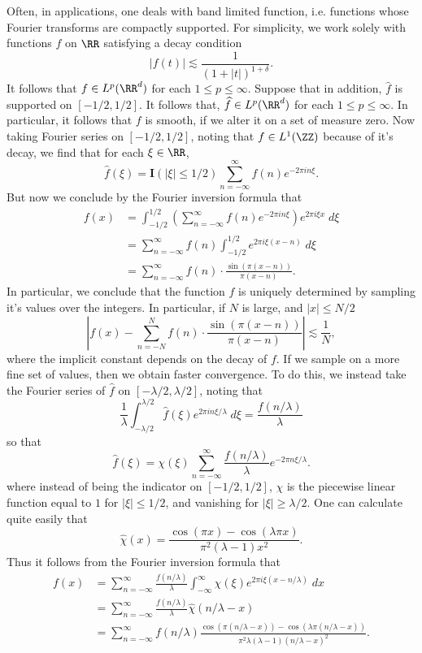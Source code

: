 Often, in applications, one deals with band limited function, i.e. functions whose Fourier transforms are compactly supported. For simplicity, we work solely with functions $f$ on $\RR$ satisfying a decay condition
%
\[ |f(t)| \lesssim \frac{1}{(1 + |t|)^{1 + \delta}}. \]
%
It follows that $f \in L^p(\RR^d)$ for each $1 \leq p \leq \infty$. Suppose that in addition, $\widehat{f}$ is supported on $[-1/2,1/2]$. It follows that, $\widehat{f} \in L^p(\RR^d)$ for each $1 \leq p \leq \infty$. In particular, it follows that $f$ is smooth, if we alter it on a set of measure zero. Now taking Fourier series on $[-1/2,1/2]$, noting that $f \in L^1(\ZZ)$ because of it's decay, we find that for each $\xi \in \RR$,
%
\[ \widehat{f}(\xi) = \mathbf{I}(|\xi| \leq 1/2) \sum_{n = -\infty}^\infty f(n) e^{-2 \pi i n \xi}. \]
%
But now we conclude by the Fourier inversion formula that
%
\begin{align*}
    f(x) &= \int_{-1/2}^{1/2} \left( \sum_{n = -\infty}^\infty f(n) e^{-2 \pi i n \xi} \right) e^{2 \pi i \xi x}\; d\xi\\
    &= \sum_{n = -\infty}^\infty f(n) \int_{-1/2}^{1/2} e^{2 \pi i \xi (x-n)}\; d\xi\\
    &= \sum_{n = -\infty}^\infty f(n) \cdot \frac{\sin(\pi (x - n))}{\pi (x-n)}.
\end{align*}
%
In particular, we conclude that the function $f$ is uniquely determined by sampling it's values over the integers. In particular, if $N$ is large, and $|x| \leq N/2$
%
\[ \left| f(x) - \sum_{n = -N}^N f(n) \cdot \frac{\sin(\pi(x - n))}{\pi (x - n)} \right| \lesssim \frac{1}{N}, \]
%
where the implicit constant depends on the decay of $f$. If we sample on a more fine set of values, then we obtain faster convergence. To do this, we instead take the Fourier series of $\widehat{f}$ on $[-\lambda/2,\lambda/2]$, noting that
%
\[ \frac{1}{\lambda} \int_{-\lambda/2}^{\lambda/2} \widehat{f}(\xi) e^{2 \pi i n \xi / \lambda}\; d\xi = \frac{f(n/\lambda)}{\lambda} \]
%
so that
%
\[ \widehat{f}(\xi) = \chi(\xi) \sum_{n = -\infty}^\infty \frac{f(n/\lambda)}{\lambda} e^{-2 \pi n \xi / \lambda}. \]
%
where instead of being the indicator on $[-1/2,1/2]$, $\chi$ is the piecewise linear function equal to $1$ for $|\xi| \leq 1/2$, and vanishing for $|\xi| \geq \lambda/2$. One can calculate quite easily that
%
\[ \widehat{\chi}(x) = \frac{\cos(\pi x) - \cos(\lambda \pi x)}{\pi^2 (\lambda - 1) x^2}. \]
%
Thus it follows from the Fourier inversion formula that
%
\begin{align*}
    f(x) &= \sum_{n = -\infty}^\infty \frac{f(n/\lambda)}{\lambda} \int_{-\infty}^\infty \chi(\xi) e^{2 \pi i \xi (x-n/\lambda)}\; dx\\
    &= \sum_{n = -\infty}^\infty \frac{f(n/\lambda)}{\lambda} \widehat{\chi}(n/\lambda - x)\\
    &= \sum_{n = -\infty}^\infty f(n/\lambda) \frac{\cos(\pi (n / \lambda - x)) - \cos(\lambda \pi (n / \lambda - x))}{\pi^2 \lambda (\lambda - 1)(n/\lambda - x)^2}.
\end{align*}
